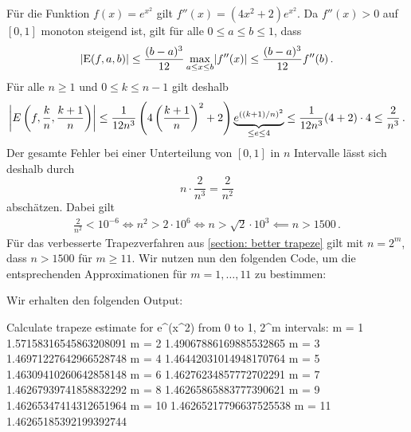 \section{}

Für die Funktion $f(x) = e^{x^2}$ gilt $f''(x) = (4x^2 + 2) e^{x^2}$.
Da $f''(x) > 0$ auf $[0,1]$ monoton steigend ist, gilt für alle $0 \leq a \leq b \leq 1$, dass
\[
        \abs{ \operatorname{E}(f,a,b) }
  \leq  \frac{(b-a)^3}{12} \max_{a \leq x \leq b} \abs{f''(x)}
  \leq  \frac{(b-a)^3}{12} f''(b)\,.
\]
Für alle $n \geq 1$ und $0 \leq k \leq n-1$ gilt deshalb
\[
        \abs*{ E\left( f, \frac{k}{n}, \frac{k+1}{n} \right) }
  \leq  \frac{1}{12 n^3} \left( 4 \left(\frac{k+1}{n}\right)^2 + 2 \right) \underbrace{e^{((k+1)/n)^2}}_{\leq e \leq 4}
  \leq  \frac{1}{12 n^3} (4 + 2) \cdot 4
  \leq  \frac{2}{n^3}\,.
\]
Der gesamte Fehler bei einer Unterteilung von $[0,1]$ in $n$ Intervalle lässt sich deshalb durch
\[
      n \cdot \frac{2}{n^3}
    = \frac{2}{n^2}
\]
abschätzen.
Dabei gilt
\begin{align*}
              \frac{2}{n^2} < 10^{-6}
  \iff        n^2 > 2 \cdot 10^6
  \iff        n > \sqrt{2} \cdot 10^3
  \impliedby  n > 1500\,.
\end{align*}
Für das verbesserte Trapezverfahren aus \ref{section: better trapeze} gilt mit $n = 2^m$, dass $n > 1500$ für $m \geq 11$.
Wir nutzen nun den folgenden Code, um die entsprechenden Approximationen für $m = 1, \dotsc, 11$ zu bestimmen:



Wir erhalten den folgenden Output:

\begin{consoleoutput}
Calculate trapeze estimate for e^(x^2) from 0 to 1, 2^m intervals:
m =  1    1.57158316545863208091
m =  2    1.49067886169885532865
m =  3    1.46971227642966528748
m =  4    1.46442031014948170764
m =  5    1.46309410260642858148
m =  6    1.46276234857772702291
m =  7    1.46267939741858832292
m =  8    1.46265865883777390621
m =  9    1.46265347414312651964
m = 10    1.46265217796637525538
m = 11    1.46265185392199392744
\end{consoleoutput}
